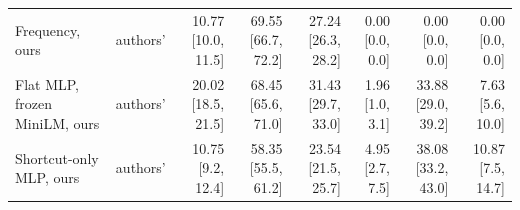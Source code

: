 \begin{table}[t]
\begin{tabular}{@{}llrrrrrr@{}}
Frequency, ours & authors' & 10.77 {\scriptsize[10.0, 11.5]} & 69.55 {\scriptsize[66.7, 72.2]} & 27.24 {\scriptsize[26.3, 28.2]} & 0.00 {\scriptsize[0.0, 0.0]} & 0.00 {\scriptsize[0.0, 0.0]} & 0.00 {\scriptsize[0.0, 0.0]} \\
Flat MLP, frozen MiniLM, ours & authors' & 20.02 {\scriptsize[18.5, 21.5]} & 68.45 {\scriptsize[65.6, 71.0]} & 31.43 {\scriptsize[29.7, 33.0]} & 1.96 {\scriptsize[1.0, 3.1]} & 33.88 {\scriptsize[29.0, 39.2]} & 7.63 {\scriptsize[5.6, 10.0]} \\
Shortcut-only MLP, ours & authors' & 10.75 {\scriptsize[9.2, 12.4]} & 58.35 {\scriptsize[55.5, 61.2]} & 23.54 {\scriptsize[21.5, 25.7]} & 4.95 {\scriptsize[2.7, 7.5]} & 38.08 {\scriptsize[33.2, 43.0]} & 10.87 {\scriptsize[7.5, 14.7]} \\
\bottomrule
\end{tabular}
\end{table}
